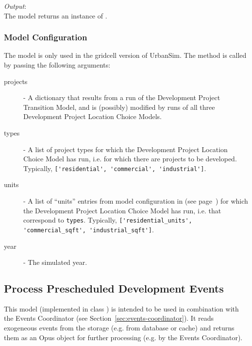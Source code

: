 {\it Output}:~\\[1mm]
The model returns an instance of .

\subsubsection{Model Configuration}
%
The model is only used in the gridcell version of UrbanSim.
The  method is called by
passing the following arguments:
\begin{description}
\item[projects] - A dictionary that results from a run of the Development
  Project Transition Model,  and is (possibly) modified by runs of all three
  Development Project Location Choice Models. 
\item[types] - A list of project types for which the Development Project
  Location Choice Model has run, i.e. for which there are projects to be
  developed. Typically, \verb|['residential', 'commercial', 'industrial']|.
\item[units] - A list of ``units'' entries from model configuration in
   (see page~\pageref{page:model-configuration}) for which the
  Development Project Location Choice Model has run, i.e. that correspond to
  \verb|types|. Typically, \verb|['residential_units', 'commercial_sqft', 'industrial_sqft']|.
\item[year] - The simulated year.
\end{description}

%
\subsection{Process Prescheduled Development Events}
%
\label{sec:process-prescheduled-development-events}
%
This model (implemented in class  )
is intended to be used in combination with the Events Coordinator (see Section~\ref{sec:events-coordinator}).
It reads exogeneous events from the storage (e.g. from database or cache) and returns them as an Opus object for further
processing (e.g. by the Events Coordinator).

%
